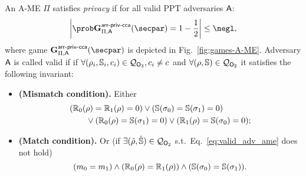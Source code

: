 \begin{definition}[Privacy of A-ME]\label{def:ame_priv}
    An A-ME $\Pi$ satisfies {\em privacy} if for all valid PPT adversaries $\mathsf{A}$:
    \[
        \left\lvert \Prob{\NISHmatchgamecca{\arranged}_{\Pi, \adversary}(\secpar) = 1} - \frac{1}{2} \right\rvert \leq \negl,
    \]
    where game $\NISHmatchgamecca{\arranged}_{\Pi, \adversary}(\secpar)$ is depicted in Fig.~\ref{fig:games-A-ME}.
    Adversary $\mathsf{A}$ is called valid if if $\forall (\rho_i, \mathbb{S}_i, c_i) \in \mathcal{Q}_{\mathsf{O}_3}, c_i \ne c$ and $\forall (\rho, \mathbb{S}) \in \mathcal{Q}_{\mathsf{O}_2}$ it satisfies the following invariant:
    \begin{itemize}
        \item \textbf{(Mismatch condition).} Either
              \begin{align}
                   & (\mathbb{R}_0(\rho) = \mathbb{R}_1(\rho)=0) \lor (\mathbb{S}(\sigma_0) = \mathbb{S}(\sigma_1)=0) \nonumber                             \\
                   & \qquad \lor (\mathbb{R}_0(\rho) = \mathbb{S}(\sigma_1)=0) \lor (\mathbb{R}_1(\rho) = \mathbb{S}(\sigma_0)=0); \label{eq:valid_adv_ame}
              \end{align}
        \item \textbf{(Match condition).} Or (if $\exists(\hat{\rho}, \hat{\mathbb{S}}) \in \mathcal{Q}_{\mathsf{O}_2}$ s.t.\ Eq.~\eqref{eq:valid_adv_ame} does not hold)
              \[
                  (m_0 = m_1) \land (\mathbb{R}_0(\rho) =\mathbb{R}_1(\rho)) \land (\mathbb{S}(\sigma_0) = \mathbb{S}(\sigma_1)).
              \]
    \end{itemize}
\end{definition}